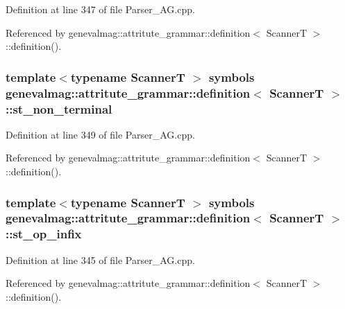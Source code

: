Definition at line 347 of file Parser\_\-AG.cpp.



Referenced by genevalmag::attritute\_\-grammar::definition$<$ ScannerT $>$::definition().

\hypertarget{structgenevalmag_1_1attritute__grammar_1_1definition_a7cf91669589785b113405dd95b5d138f}{
\subsubsection[{st\_\-non\_\-terminal}]{\setlength{\rightskip}{0pt plus 5cm}template$<$typename ScannerT $>$ symbols {\bf genevalmag::attritute\_\-grammar::definition}$<$ ScannerT $>$::{\bf st\_\-non\_\-terminal}}}
\label{structgenevalmag_1_1attritute__grammar_1_1definition_a7cf91669589785b113405dd95b5d138f}


Definition at line 349 of file Parser\_\-AG.cpp.



Referenced by genevalmag::attritute\_\-grammar::definition$<$ ScannerT $>$::definition().

\hypertarget{structgenevalmag_1_1attritute__grammar_1_1definition_ae9a2e330966fb02491bf0663ec3b5b96}{
\subsubsection[{st\_\-op\_\-infix}]{\setlength{\rightskip}{0pt plus 5cm}template$<$typename ScannerT $>$ symbols {\bf genevalmag::attritute\_\-grammar::definition}$<$ ScannerT $>$::{\bf st\_\-op\_\-infix}}}
\label{structgenevalmag_1_1attritute__grammar_1_1definition_ae9a2e330966fb02491bf0663ec3b5b96}


Definition at line 345 of file Parser\_\-AG.cpp.



Referenced by genevalmag::attritute\_\-grammar::definition$<$ ScannerT $>$::definition().

